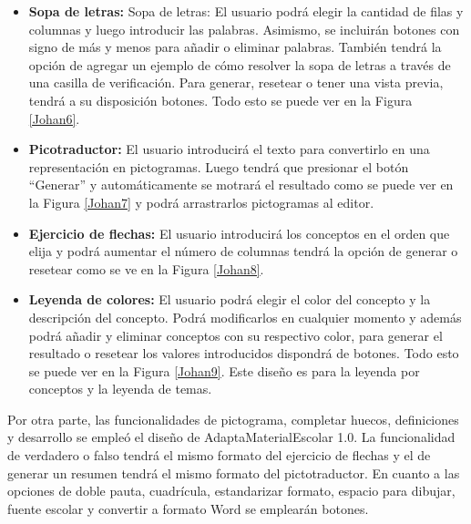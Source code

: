 \begin{itemize}
  \item \textbf{Sopa de letras:} Sopa de letras: El usuario podrá elegir la cantidad de filas y columnas y luego introducir las palabras. Asimismo, se incluirán botones con signo de más y menos para añadir o eliminar palabras. También tendrá la opción de agregar un ejemplo de cómo resolver la sopa de letras a través de una casilla de verificación. Para generar, resetear o tener una vista previa, tendrá a su disposición botones. Todo esto se puede ver en la Figura \ref{Johan6}.
  \item \textbf{Picotraductor:} El usuario introducirá el texto para convertirlo en una representación en pictogramas. Luego tendrá que presionar el botón ``Generar'' y automáticamente se motrará el resultado como se puede ver en la Figura \ref{Johan7} y podrá arrastrarlos pictogramas al editor.
  \item \textbf{Ejercicio de flechas:} El usuario introducirá los conceptos en el orden que elija y podrá aumentar el número de columnas tendrá la opción de generar o resetear como se ve en la Figura \ref{Johan8}.
  \item  \textbf{Leyenda de colores:} El usuario podrá elegir el color del concepto y la descripción del concepto. Podrá modificarlos en cualquier momento y además podrá añadir y eliminar conceptos con su respectivo color, para generar el resultado o resetear los valores introducidos dispondrá de botones. Todo esto se puede ver en la Figura \ref{Johan9}. Este diseño es para la leyenda por conceptos y la leyenda de temas.
\end{itemize}

Por otra parte, las funcionalidades de pictograma, completar huecos, definiciones y desarrollo se empleó el diseño de AdaptaMaterialEscolar 1.0. La funcionalidad de verdadero o falso tendrá el mismo formato del ejercicio de flechas y el de generar un resumen tendrá el mismo formato del pictotraductor. En cuanto a las opciones de doble pauta, cuadrícula, estandarizar formato, espacio para dibujar, fuente escolar y convertir a formato Word se emplearán botones.

